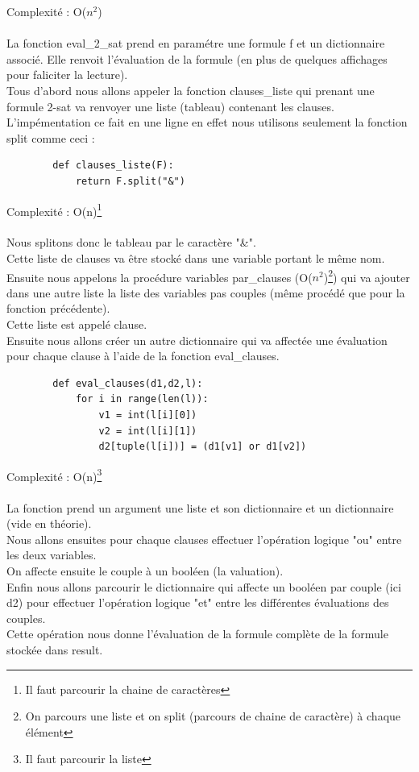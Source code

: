 \documentclass{article}
\begin{document}
    Complexité : O($n^2$) \\ \\
    La fonction eval\_2\_sat prend en paramétre une formule f et un dictionnaire associé. Elle renvoit l'évaluation de la formule (en plus de quelques affichages pour faliciter la lecture). \\
    Tous d'abord nous allons appeler la fonction clauses\_liste qui prenant une formule 2-sat va renvoyer une liste (tableau) contenant les clauses. \\
    L'impémentation ce fait en une ligne en effet nous utilisons seulement la fonction split comme ceci : 
    \begin{lstlisting}
        def clauses_liste(F):
            return F.split("&") 
    \end{lstlisting}
    Complexité : O(n)\footnote{Il faut parcourir la chaine de caractères} \\
    \\
    Nous splitons donc le tableau par le caractère "\&". \\
    Cette liste de clauses va être stocké dans une variable portant le même nom. \\ 
    Ensuite nous appelons la procédure variables par\_clauses (O($n^2$)\footnote{On parcours une liste et on split (parcours de chaine de caractère) à chaque élément}) qui va ajouter dans une autre liste la liste des variables pas couples (même procédé que pour la fonction précédente). \\
    Cette liste est appelé clause. \\
    Ensuite nous allons créer un autre dictionnaire qui va affectée une évaluation pour chaque clause à l'aide de la fonction eval\_clauses. \\
    \begin{lstlisting}
        def eval_clauses(d1,d2,l):
            for i in range(len(l)):
                v1 = int(l[i][0])
                v2 = int(l[i][1])
                d2[tuple(l[i])] = (d1[v1] or d1[v2])
    \end{lstlisting}
    Complexité : O(n)\footnote{Il faut parcourir la liste} \\
    \\
    La fonction prend un argument une liste et son dictionnaire et un dictionnaire (vide en théorie). \\
    Nous allons ensuites pour chaque clauses effectuer l'opération logique "ou" entre les deux variables. \\
    On affecte ensuite le couple à un booléen (la valuation). \\
    Enfin nous allons parcourir le dictionnaire qui affecte un booléen par couple (ici d2) pour effectuer l'opération logique "et" entre les différentes évaluations des couples. \\
    Cette opération nous donne l'évaluation de la formule complète de la formule stockée dans result.   
\end{document}
